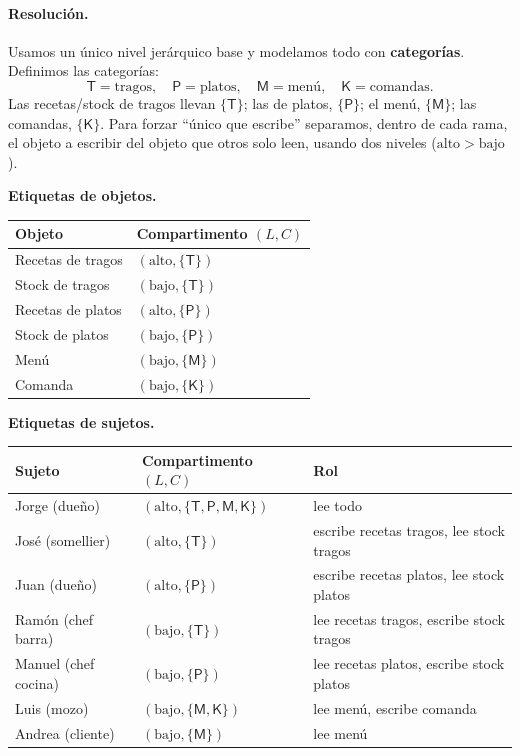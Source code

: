 \paragraph{Resolución.}
Usamos un único nivel jerárquico base y modelamos todo con \textbf{categorías}. Definimos las categorías:
\[
  \mathsf{T}=\text{tragos},\quad \mathsf{P}=\text{platos},\quad \mathsf{M}=\text{menú},\quad \mathsf{K}=\text{comandas}.
\]
Las recetas/stock de tragos llevan $\{\mathsf{T}\}$; las de platos, $\{\mathsf{P}\}$; el menú, $\{\mathsf{M}\}$; las comandas, $\{\mathsf{K}\}$. Para forzar ``único que escribe'' separamos, dentro de cada rama, el objeto a escribir del objeto que otros solo leen, usando dos niveles ($\mathrm{alto}>\mathrm{bajo}$).

\medskip
\textbf{Etiquetas de objetos.}
\begin{center}
\renewcommand{\arraystretch}{1.2}
\begin{tabular}{ll}
\toprule
Objeto & Compartimento $(L,C)$ \\
\midrule
Recetas de tragos        & $(\mathrm{alto},\{\mathsf{T}\})$ \\
Stock de tragos          & $(\mathrm{bajo},\{\mathsf{T}\})$ \\
Recetas de platos        & $(\mathrm{alto},\{\mathsf{P}\})$ \\
Stock de platos          & $(\mathrm{bajo},\{\mathsf{P}\})$ \\
Menú                     & $(\mathrm{bajo},\{\mathsf{M}\})$ \\
Comanda                  & $(\mathrm{bajo},\{\mathsf{K}\})$ \\
\bottomrule
\end{tabular}
\end{center}

\textbf{Etiquetas de sujetos.}
\begin{center}
\renewcommand{\arraystretch}{1.2}
\begin{tabular}{lll}
\toprule
Sujeto & Compartimento $(L,C)$ & Rol \\
\midrule
Jorge (dueño)      & $(\mathrm{alto},\{\mathsf{T},\mathsf{P},\mathsf{M},\mathsf{K}\})$ & lee todo \\
José (somellier)   & $(\mathrm{alto},\{\mathsf{T}\})$ & escribe recetas tragos, lee stock tragos \\
Juan (dueño)       & $(\mathrm{alto},\{\mathsf{P}\})$ & escribe recetas platos, lee stock platos \\
Ramón (chef barra) & $(\mathrm{bajo},\{\mathsf{T}\})$ & lee recetas tragos, escribe stock tragos \\
Manuel (chef cocina)& $(\mathrm{bajo},\{\mathsf{P}\})$ & lee recetas platos, escribe stock platos \\
Luis (mozo)        & $(\mathrm{bajo},\{\mathsf{M},\mathsf{K}\})$ & lee menú, escribe comanda \\
Andrea (cliente)   & $(\mathrm{bajo},\{\mathsf{M}\})$ & lee menú \\
\bottomrule
\end{tabular}
\end{center}

